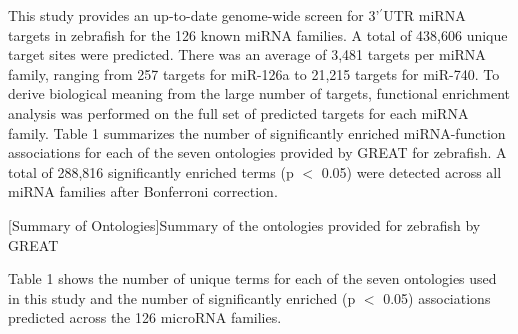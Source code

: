 \documentclass[12pt]{article}
\begin{document}
This study provides an up-to-date genome-wide screen for 3’$^\prime$UTR miRNA targets in zebrafish for the 126 known miRNA families. A total of 438,606 unique target sites were predicted. There was an average of 3,481 targets per miRNA family, ranging from 257 targets for miR-126a to 21,215 targets for miR-740. To derive biological meaning from the large number of targets, functional enrichment analysis was performed on the full set of predicted targets for each miRNA family. Table 1 summarizes the number of significantly enriched miRNA-function associations for each of the seven ontologies provided by GREAT for zebrafish. A total of 288,816 significantly enriched terms (p $<$ 0.05) were detected across all miRNA families after Bonferroni correction.
\begin{table}[h!]
\centering
{}[Summary of Ontologies]{Summary of the ontologies provided for zebrafish by GREAT
}
\\
\begin{flushleft}{\scriptsize Table 1 shows the number of unique terms for each of the seven ontologies used in this study and the number of significantly enriched (p $<$ 0.05) associations predicted across the 126 microRNA families.}\end{flushleft}
\label{1}
\end{table}
\end{document}
